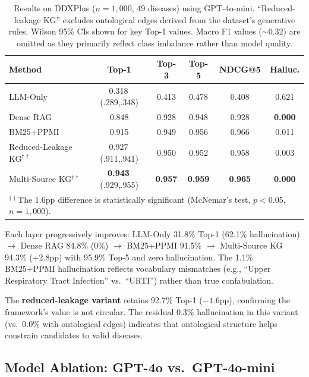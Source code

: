\documentclass[runningheads]{llncs}
\begin{document}
\begin{table}[t]
\centering
\caption{Results on DDXPlus ($n{=}1{,}000$, 49 diseases) using GPT-4o-mini. ``Reduced-leakage KG'' excludes ontological edges derived from the dataset's generative rules. Wilson 95\% CIs shown for key Top-1 values. Macro F1 values (${\sim}$0.32) are omitted as they primarily reflect class imbalance rather than model quality.}
\label{tab:ddxplus}
\begin{tabular}{lccccc}
\toprule
\textbf{Method} & \textbf{Top-1} & \textbf{Top-3} & \textbf{Top-5} & \textbf{NDCG@5} & \textbf{Halluc.} \\
\midrule
LLM-Only       & 0.318\,{\scriptsize(.289,.348)} & 0.413 & 0.478 & 0.408 & 0.621 \\
Dense RAG       & 0.848 & 0.928 & 0.948 & 0.928 & \textbf{0.000} \\
BM25+PPMI       & 0.915 & 0.949 & 0.956 & 0.966 & 0.011 \\
Reduced-Leakage KG$^{\dagger\dagger}$ & 0.927\,{\scriptsize(.911,.941)} & 0.950 & 0.952 & 0.958 & 0.003 \\
Multi-Source KG$^{\dagger\dagger}$ & \textbf{0.943}\,{\scriptsize(.929,.955)} & \textbf{0.957} & \textbf{0.959} & \textbf{0.965} & \textbf{0.000} \\
\bottomrule
\multicolumn{6}{l}{\scriptsize $^{\dagger\dagger}$The 1.6pp difference is statistically significant (McNemar's test, $p < 0.05$, $n = 1{,}000$).}
\end{tabular}
\end{table}

Each layer progressively improves: LLM-Only 31.8\% Top-1 (62.1\% hallucination) $\to$ Dense RAG 84.8\% (0\%) $\to$ BM25+PPMI 91.5\% $\to$ Multi-Source KG 94.3\% (+2.8pp) with 95.9\% Top-5 and zero hallucination. The 1.1\% BM25+PPMI hallucination reflects vocabulary mismatches (e.g., ``Upper Respiratory Tract Infection'' vs.\ ``URTI'') rather than true confabulation.

The \textbf{reduced-leakage variant} retains 92.7\% Top-1 ($-1.6$pp), confirming the framework's value is not circular. The residual 0.3\% hallucination in this variant (vs.\ 0.0\% with ontological edges) indicates that ontological structure helps constrain candidates to valid diseases.

\subsection{Model Ablation: GPT-4o vs.\ GPT-4o-mini}
\label{sec:model_ablation}
\end{document}
